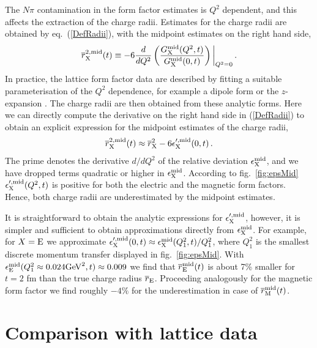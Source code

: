 \documentclass[11pt,prd,aps,showpacs,eqsecnum,floatfix,nofootinbib,preprint,tightenlines]{revtex4}
\newcommand{\pref}[1]{(\ref{#1})}
\begin{document}
The $N\pi$ contamination in the form factor estimates is $Q^2$ dependent, and this affects the extraction of the charge radii. 
Estimates for the charge radii are obtained by eq.\ \pref{DefRadii}, with the midpoint estimates on the right hand side,
\begin{eqnarray}\label{DefRadiiMid}
\overline{r}^{2,{\rm mid}}_{\rm X}(t)\equiv -6 \frac{d}{d Q^2} \left(\frac{G^{\rm mid}_{\rm X}(Q^2,t)}{G^{\rm mid}_{\rm X}(0,t)}\right)\bigg|_{Q^2=0}\,.
\end{eqnarray}
In practice, the lattice form factor data are described by fitting a suitable  parameterisation of the $Q^2$ dependence, for example a dipole form or the $z$-expansion \cite{Hill:2010yb}. The charge radii are then obtained from these analytic forms. Here we can directly compute the derivative on the right hand side in \pref{DefRadii} to obtain an explicit expression for the midpoint estimates of the charge radii,
\begin{eqnarray}
\overline{r}^{2,{\rm mid}}_{\rm X}(t) \approx \overline{r}^{2}_{\rm X} -6 \epsilon_{\rm X}^{\prime,{\rm mid}}(0,t)\,.
\end{eqnarray}
The prime denotes the derivative $d/dQ^2$ of the relative deviation $\epsilon_{\rm X}^{{\rm mid}}$, and we have dropped terms quadratic or higher in $\epsilon_{\rm X}^{{\rm mid}}$. According to fig.\ \ref{fig:epsMid}  $\epsilon_{\rm X}^{\prime,{\rm mid}}(Q^2,t)$ is positive for both the electric and the magnetic form factors. Hence, both charge radii are underestimated by the midpoint estimates. 

It is straightforward to obtain the analytic expressions for $\epsilon_{\rm X}^{\prime,{\rm mid}}$, however, it is simpler and sufficient to obtain approximations directly from $\epsilon_{\rm X}^{{\rm mid}}$. For example, for $X={\rm E}$ we approximate $\epsilon_{\rm X}^{\prime,{\rm mid}}(0,t)\approx \epsilon_{\rm X}^{{\rm mid}}(Q^2_1,t)/Q^2_1$, where $Q^2_1$ is the smallest discrete momentum transfer displayed in fig.\ \ref{fig:epsMid}. With $\epsilon_{\rm E}^{{\rm mid}}(Q^2_1\approx 0.024{\rm GeV}^2,t)\approx 0.009$ we find that $\overline{r}^{{\rm mid}}_{\rm E}(t)$ is about 7\% smaller for $t=2$ fm  than the true charge radius $\overline{r}_{\rm E}$. Proceeding analogously for the magnetic form factor we find roughly $-4\%$ for the underestimation in case of $\overline{r}^{{\rm mid}}_{\rm M}(t)$.

%
\section{Comparison with lattice data}
%
\end{document}
